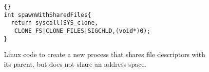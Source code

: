 \begin{comment}
My Plan:
(1) If we can track all writes, then output those callsites with writes times larger than 10000.
Then we could try to check the false negative rate.
(2) We can show an table, that explains the false sharing rate on small objects and larger objects. 
So it is used to prove that we don't care much about those larger objects. 
Also, it is good to show that we can use a parser interval to capture those interleaving writes on the same page.
Then if one page is captured to have some interleaving writes, then we should keep that. Otherwise, we 
will use a parser mechanism to capture those writes. 
(3) Maybe it is good to use the deterministic pid for each process.
(4) Output the detail information about false sharing, inter-object false sharing or intra object false sharing.
(5) Should we modify the code to handle the callsite problem? Whether to modify the code when one place are changed by several
threads in the same time.


TONGPING:
MIT's shortcoming:
(1) They made assumptions on hardware: 
There are no more than 32 threads/cores simultaneously active in an application since
they don't want to explode their memory consumption. Because they have no idea about how 
many threads are in the applications (they are not trying to getpid inside).

For false sharing detection, they can only support 8 threads.
I guess that they cannot handle the thread migration, they will definitely have false positives since
they cannot detect this condition.

(2) They cannot differentiate the cold cache misses and false sharing.
Where they classified histogram as false sharing.

(3) They can't tell the cause of false sharing. They can just say some lines of code invoke the false sharing problem.
But they can't tell how and where. So if instructions are distributed across different instructions, then it is hard
to aggregate while providing enough notice. 
\end{comment}



\begin{figure}[!t]
\small
\begin{lstlisting}[frame=trbl]{}
int spawnWithSharedFiles{
  return syscall(SYS_clone, 
   CLONE_FS|CLONE_FILES|SIGCHLD,(void*)0);
}
\end{lstlisting}
\caption{Linux code to create a new process that shares file
  descriptors with its parent, but does not share an address space.
\label{fig:newfork}}
\end{figure}


